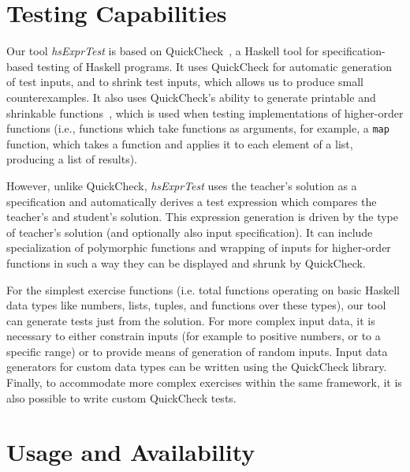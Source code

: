 \documentclass[sigconf,screen]{acmart} %
\newcommand{\hsExprTest}{\textit{hsExprTest}}
\begin{document}

\maketitle

\section{Testing Capabilities}

Our tool \hsExprTest{} is based on QuickCheck~\cite{Koen2000}, a Haskell tool for
specification-based testing of Haskell programs.
It uses QuickCheck for automatic generation of test inputs, and to shrink test
inputs, which allows us to produce small counterexamples.
It also uses QuickCheck's ability to generate printable and shrinkable
functions~\cite{Koen2012}, which is used when testing implementations of
higher-order functions (i.e., functions which take functions as arguments, for
example, a \texttt{map} function, which takes a function and applies it to each
element of a list, producing a list of results).

However, unlike QuickCheck, \hsExprTest{} uses the teacher's solution as a
specification and automatically derives a test expression which compares the
teacher's and student's solution.
This expression generation is driven by the type of teacher's solution (and
optionally also input specification).
It can include specialization of
polymorphic functions and wrapping of inputs for higher-order functions in such
a way they can be displayed and shrunk by QuickCheck.

For the simplest exercise functions (i.e. total functions operating on basic
Haskell data types like numbers, lists, tuples, and functions over these
types), our tool can generate tests just from the solution.
For more complex input data, it is necessary to either constrain inputs
(for example to positive numbers, or to a specific range) or to provide means
of generation of random inputs.
Input data generators for custom data types can be written using the QuickCheck
library.
Finally, to accommodate more complex exercises within the same framework, it is
also possible to write custom QuickCheck tests.

\section{Usage and Availability}
\end{document}
